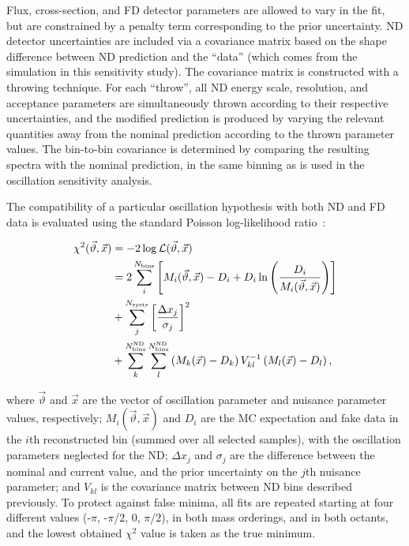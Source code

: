 Flux, cross-section, and FD detector parameters are allowed to vary in the fit, but are constrained by a penalty term corresponding to the prior uncertainty. ND detector uncertainties are included via a covariance matrix based on the shape difference between ND prediction and the ``data'' (which comes from the simulation in this sensitivity study). The covariance matrix is constructed with a throwing technique. For each ``throw'', all ND energy scale, resolution, and acceptance parameters are simultaneously thrown according to their respective uncertainties, and the modified prediction is produced by varying the relevant quantities away from the nominal prediction according to the thrown parameter values. The bin-to-bin covariance is determined by comparing the resulting spectra with the nominal prediction, in the same binning as is used in the oscillation sensitivity analysis.

The compatibility of a particular oscillation hypothesis with both ND and FD data is evaluated using the standard Poisson log-likelihood ratio~\cite{Tanabashi:2018oca}:
\begin{linenomath*}
  \begin{equation}
    \begin{aligned}
      \chi^2(\vec{\vartheta}, \vec{x}) &= -2\log\mathcal{L}(\vec{\vartheta}, \vec{x}) \\
      &= 2\sum_i^{N_{\rm bins}}\left[ M_i(\vec{\vartheta}, \vec{x})-D_i+D_i\ln\left({D_i\over M_i(\vec{\vartheta}, \vec{x})}\right) \right] \\
      &+ \sum_{j}^{N_{\mathrm{systs}}}\left[ \frac{\Delta x_{j}}{\sigma_{j}} \right]^{2} \\
      &+ \sum^{N^{\mathrm{ND}}_{\mathrm{bins}}}_{k}\sum^{N^{\mathrm{ND}}_{\mathrm{bins}}}_{l} \left(M_k(\vec{x})-D_k \right) V^{-1}_{kl}\left(M_l(\vec{x})-D_l \right),
    \end{aligned}
    \label{eq:chisq}
  \end{equation}
\end{linenomath*}
where $\vec{\vartheta}$ and $\vec{x}$ are the vector of oscillation parameter and nuisance parameter values, respectively; $M_i(\vec{\vartheta}, \vec{x})$ and $D_{i}$ are the MC expectation and fake data in the $i$th reconstructed bin (summed over all selected samples), with the oscillation parameters neglected for the ND; $\Delta x_{j}$ and $\sigma_{j}$ are the difference between the nominal and current value, and the prior uncertainty on the $j$th nuisance parameter; and $V_{kl}$ is the covariance matrix between ND bins described previously. To protect against false minima, all fits are repeated starting at four different \deltacp values (-$\pi$, -$\pi$/2, 0, $\pi$/2), in both mass orderings, and in both  octants, and the lowest obtained $\chi^{2}$ value is taken as the true minimum.

